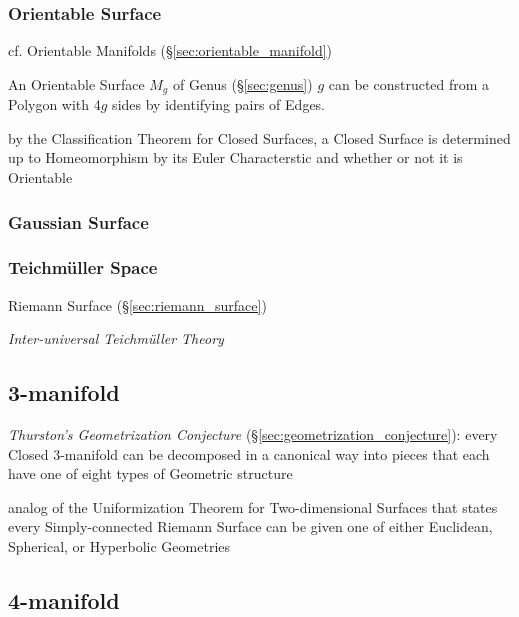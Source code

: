 \subsubsection{Orientable Surface}\label{sec:orientable_surface}\hfill

cf. Orientable Manifolds (\S\ref{sec:orientable_manifold})

An Orientable Surface $M_g$ of Genus (\S\ref{sec:genus}) $g$ can
be constructed from a Polygon with $4g$ sides by identifying pairs of Edges.

by the Classification Theorem for Closed Surfaces, a Closed Surface is
determined up to Homeomorphism by its Euler Characterstic and whether or not it
is Orientable



\subsubsection{Gaussian Surface}\label{sec:gaussian_surface}\hfill

\subsubsection{Teichm\"uller Space}\label{sec:teichmuller_space}

Riemann Surface (\S\ref{sec:riemann_surface})

\emph{Inter-universal Teichm\"uller Theory} %



\subsection{3-manifold}\label{sec:three_manifold}

\emph{Thurston's Geometrization Conjecture}
(\S\ref{sec:geometrization_conjecture}): every Closed 3-manifold can be
decomposed in a canonical way into pieces that each have one of eight types of
Geometric structure

analog of the Uniformization Theorem for Two-dimensional Surfaces that states
every Simply-connected Riemann Surface can be given one of either Euclidean,
Spherical, or Hyperbolic Geometries



\subsection{4-manifold}\label{sec:four_manifold}

